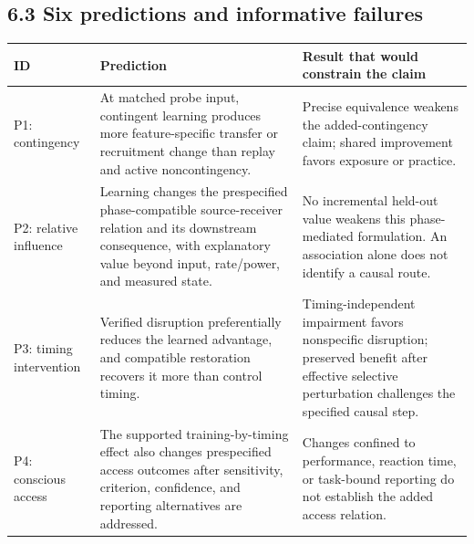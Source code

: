 \documentclass[
  american,
  11pt,
  letterpaper,
]{article}
\newcounter{none} %
\begin{document}
\par\ifdim\dimexpr\pagegoal-\pagetotal\relax<120pt\newpage\fi
\subsection{6.3 Six predictions and informative failures}\label{six-predictions-and-informative-failures}

{\def\LTcaptype{none} %
\begin{longtable}[]{@{}
  >{\raggedright\arraybackslash}p{}
  >{\raggedright\arraybackslash}p{}
  >{\raggedright\arraybackslash}p{}@{}}
\toprule\noalign{}
\begin{minipage}[b]{\linewidth}\raggedright
ID
\end{minipage} & \begin{minipage}[b]{\linewidth}\raggedright
Prediction
\end{minipage} & \begin{minipage}[b]{\linewidth}\raggedright
Result that would constrain the claim
\end{minipage} \\
\midrule\noalign{}
\endhead
\bottomrule\noalign{}
\endlastfoot
P1: contingency & At matched probe input, contingent learning produces more feature-specific transfer or recruitment change than replay and active noncontingency. & Precise equivalence weakens the added-contingency claim; shared improvement favors exposure or practice. \\
P2: relative influence & Learning changes the prespecified phase-compatible source-receiver relation and its downstream consequence, with explanatory value beyond input, rate/power, and measured state. & No incremental held-out value weakens this phase-mediated formulation. An association alone does not identify a causal route. \\
P3: timing intervention & Verified disruption preferentially reduces the learned advantage, and compatible restoration recovers it more than control timing. & Timing-independent impairment favors nonspecific disruption; preserved benefit after effective selective perturbation challenges the specified causal step. \\
P4: conscious access & The supported training-by-timing effect also changes prespecified access outcomes after sensitivity, criterion, confidence, and reporting alternatives are addressed. & Changes confined to performance, reaction time, or task-bound reporting do not establish the added access relation. \\

\end{longtable}}
\end{document}
